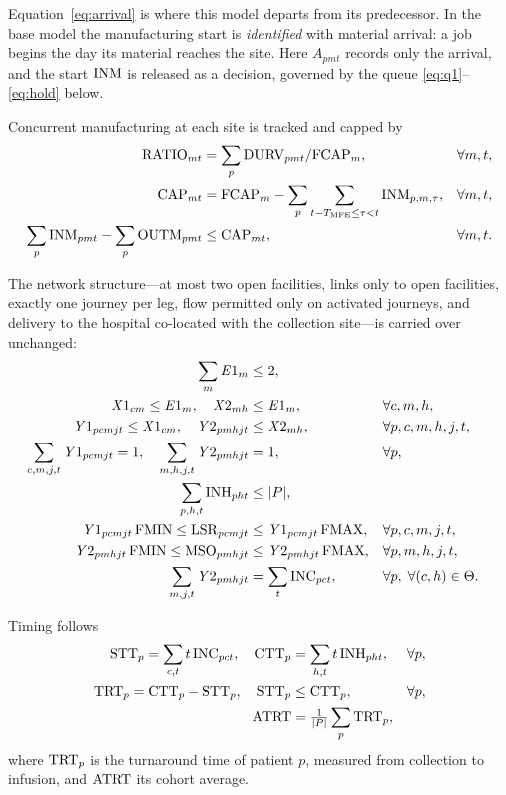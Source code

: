 Equation~\eqref{eq:arrival} is where this model departs from its predecessor.
In the base model the manufacturing start is \emph{identified} with material
arrival: a job begins the day its material reaches the site. Here $A_{pmt}$
records only the arrival, and the start $\mathrm{INM}$ is released as a decision,
governed by the queue \eqref{eq:q1}--\eqref{eq:hold} below.

Concurrent manufacturing at each site is tracked and capped by
\begin{align}
  \mathrm{RATIO}_{mt} &= \sum_{p} \mathrm{DURV}_{pmt} / \mathrm{FCAP}_m, & &\forall m,t, \label{eq:ratio}\\
  \mathrm{CAP}_{mt} &= \mathrm{FCAP}_m - \sum_{p} \sum_{t-T_{\mathrm{MFE}} \le \tau < t} \mathrm{INM}_{p,m,\tau},
              & &\forall m,t, \label{eq:capdef}\\
  \sum_{p} \mathrm{INM}_{pmt} - \sum_{p} \mathrm{OUTM}_{pmt} &\le \mathrm{CAP}_{mt}, & &\forall m,t. \label{eq:cap}
\end{align}

The network structure---at most two open facilities, links only to open
facilities, exactly one journey per leg, flow permitted only on activated
journeys, and delivery to the hospital co-located with the collection site---is
carried over unchanged:
\begin{align}
  \sum_{m} \mathit{E}1_m &\le 2, \label{eq:con1}\\
  \mathit{X}1_{cm} \le \mathit{E}1_m,\quad \mathit{X}2_{mh} &\le \mathit{E}1_m, & &\forall c,m,h, \label{eq:con2}\\
  \mathit{Y}1_{pcmjt} \le \mathit{X}1_{cm},\quad \mathit{Y}2_{pmhjt} &\le \mathit{X}2_{mh},
      & &\forall p,c,m,h,j,t, \label{eq:con3}\\
  \sum_{c,m,j,t} \mathit{Y}1_{pcmjt} = 1,\quad \sum_{m,h,j,t} \mathit{Y}2_{pmhjt} &= 1,
      & &\forall p, \label{eq:con4}\\
  \sum_{p,h,t} \mathrm{INH}_{pht} &\le |P|, \label{eq:con5}\\
  \mathit{Y}1_{pcmjt}\,\mathrm{FMIN} \le \mathrm{LSR}_{pcmjt} &\le \mathit{Y}1_{pcmjt}\,\mathrm{FMAX},
      & &\forall p,c,m,j,t, \label{eq:con6}\\
  \mathit{Y}2_{pmhjt}\,\mathrm{FMIN} \le \mathrm{MSO}_{pmhjt} &\le \mathit{Y}2_{pmhjt}\,\mathrm{FMAX},
      & &\forall p,m,h,j,t, \label{eq:con7}\\
  \sum_{m,j,t} \mathit{Y}2_{pmhjt} &= \sum_{t} \mathrm{INC}_{pct},
      & &\forall p,\; \forall (c,h) \in \Theta. \label{eq:con8}
\end{align}

Timing follows
\begin{align}
  \mathrm{STT}_p = \sum_{c,t} t\,\mathrm{INC}_{pct}, \quad
  \mathrm{CTT}_p &= \sum_{h,t} t\,\mathrm{INH}_{pht}, & &\forall p, \label{eq:times}\\
  \mathrm{TRT}_p = \mathrm{CTT}_p - \mathrm{STT}_p, \quad \mathrm{STT}_p &\le \mathrm{CTT}_p, & &\forall p, \label{eq:trt}\\
  \mathrm{ATRT} &= \tfrac{1}{|P|}\sum_{p} \mathrm{TRT}_p, \label{eq:atrt}
\end{align}
where $\mathrm{TRT}_p$ is the turnaround time of patient $p$, measured from collection
to infusion, and $\mathrm{ATRT}$ its cohort average.

